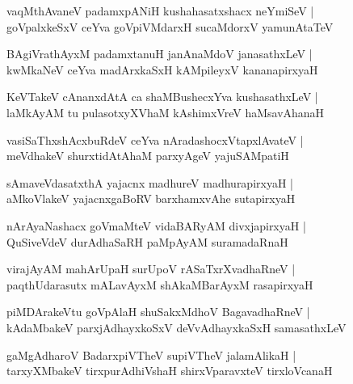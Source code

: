 \begin{shloka}
vaqMthAvaneV padamxpANiH kushahasatxshacx neYmiSeV |\\
goVpalxkeSxV ceYva goVpiVMdarxH sucaMdorxV yamunAtaTeV 
\end{shloka}

\begin{shloka}
BAgiVrathAyxM padamxtanuH janAnaMdoV janasathxLeV |\\
kwMkaNeV ceYva madArxkaSxH kAMpileyxV kananapirxyaH
\end{shloka}

\begin{shloka}
KeVTakeV cAnanxdAtA ca shaMBushecxYva kushasathxLeV |\\
laMkAyAM tu pulasotxyXVhaM kAshimxVreV haMsavAhanaH 
\end{shloka}

\begin{shloka}
vasiSaThxshAcxbuRdeV ceYva nAradashocxVtapxlAvateV |\\
meVdhakeV shurxtidAtAhaM parxyAgeV yajuSAMpatiH 
\end{shloka}

\begin{shloka}
sAmaveVdasatxthA yajacnx madhureV madhurapirxyaH |\\
aMkoVlakeV yajacnxgaBoRV barxhamxvAhe sutapirxyaH 
\end{shloka}

\begin{shloka}
nArAyaNashacx goVmaMteV vidaBARyAM divxjapirxyaH |\\
QuSiveVdeV durAdhaSaRH paMpAyAM suramadaRnaH 
\end{shloka}

\begin{shloka}
virajAyAM mahArUpaH surUpoV rASaTxrXvadhaRneV |\\
paqthUdarasutx mALavAyxM shAkaMBarAyxM rasapirxyaH 
\end{shloka}

\begin{shloka}
piMDArakeVtu goVpAlaH shuSakxMdhoV BagavadhaRneV |\\
kAdaMbakeV parxjAdhayxkoSxV deVvAdhayxkaSxH samasathxLeV 
\end{shloka}

\begin{shloka}
gaMgAdharoV BadarxpiVTheV supiVTheV jalamAlikaH |\\
tarxyXMbakeV tirxpurAdhiVshaH shirxVparavxteV tirxloVcanaH 
\end{shloka}

